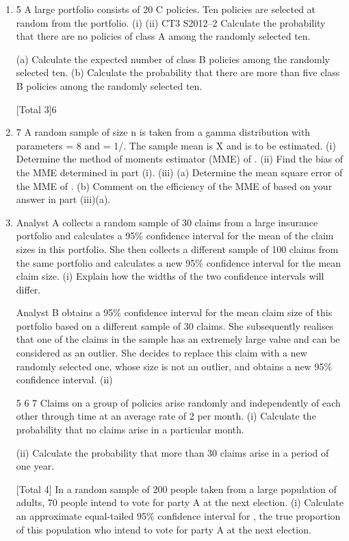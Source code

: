 \documentclass[a4paper,12pt]{article}
\begin{document}
\begin{enumerate}
\item 
5
A large portfolio consists of 20%
C policies. Ten policies are selected at random from the portfolio.
(i)
(ii)
CT3 S2012–2
Calculate the probability that there are no policies of class A among the
randomly selected ten.

(a) Calculate the expected number of class B policies among the randomly
selected ten.
(b) Calculate the probability that there are more than five class B policies
among the randomly selected ten.

[Total 3]6

\item 7
A random sample of size n is taken from a gamma distribution with parameters \alpha = 8
and \lambda = 1/\theta. The sample mean is X and \theta is to be estimated.
(i) Determine the method of moments estimator (MME) of \theta. 
(ii) Find the bias of the MME determined in part (i). 
(iii) (a) Determine the mean square error of the MME of \theta. (b) Comment on the efficiency of the MME of \theta based on your answer in
part (iii)(a).


\item Analyst A collects a random sample of 30 claims from a large insurance portfolio and
calculates a 95\% confidence interval for the mean of the claim sizes in this portfolio.
She then collects a different sample of 100 claims from the same portfolio and
calculates a new 95\% confidence interval for the mean claim size.
(i)
Explain how the widths of the two confidence intervals will differ.

Analyst B obtains a 95\% confidence interval for the mean claim size of this portfolio
based on a different sample of 30 claims. She subsequently realises that one of the
claims in the sample has an extremely large value and can be considered as an outlier.
She decides to replace this claim with a new randomly selected one, whose size is not
an outlier, and obtains a new 95\% confidence interval.
(ii)

5
6
7
Claims on a group of policies arise randomly and independently of each other through
time at an average rate of 2 per month.
(i) Calculate the probability that no claims arise in a particular month.

(ii) Calculate the probability that more than 30 claims arise in a period of one
year.

[Total 4]
In a random sample of 200 people taken from a large population of adults, 70 people
intend to vote for party A at the next election.
(i) Calculate an approximate equal-tailed 95\% confidence interval for \theta, the true
proportion of this population who intend to vote for party A at the next
election.


\end{enumerate}
\end{document}
